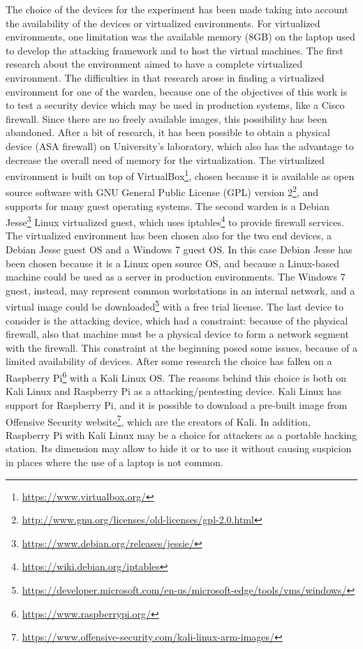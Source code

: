 \documentclass[12pt]{article}
\begin{document}
The choice of the devices for the experiment has been made taking into account the availability of the devices or virtualized environments. For virtualized environments, one limitation was the available memory (8GB) on the laptop used to develop the attacking framework and to host the virtual machines. The first research about the environment aimed to have a complete virtualized environment. The difficulties in that research arose in finding a virtualized environment for one of the warden, because one of the objectives of this work is to test a security device which may be used in production systems, like a Cisco firewall. Since there are no freely available images, this possibility has been abandoned. After a bit of research, it has been possible to obtain a physical device (ASA firewall) on University's laboratory, which also has the advantage to decrease the overall need of memory for the virtualization. The virtualized environment is built on top of VirtualBox\footnote{\url{https://www.virtualbox.org/}}, chosen because it is available as open source software with GNU General Public License (GPL) version 2\footnote{\url{http://www.gnu.org/licenses/old-licenses/gpl-2.0.html}}, and supports for many guest operating systems. The second warden is a Debian Jesse\footnote{\url{https://www.debian.org/releases/jessie/}} Linux virtualized guest, which uses iptables\footnote{\url{https://wiki.debian.org/iptables}} to provide firewall services. The virtualized environment has been chosen also for the two end devices, a Debian Jesse guest OS and a Windows 7 guest OS. In this case Debian Jesse has been chosen because it is a Linux open source OS, and because a Linux-based machine could be used as a server in production environments. The Windows 7 guest, instead, may represent common workstations in an internal network, and a virtual image could be downloaded\footnote{\url{https://developer.microsoft.com/en-us/microsoft-edge/tools/vms/windows/}} with a free trial license. The last device to consider is the attacking device, which had a constraint: because of the physical firewall, also that machine must be a physical device to form a network segment with the firewall. This constraint at the beginning posed some issues, because of a limited availability of devices. After some research the choice has fallen on a Raspberry Pi\footnote{\url{https://www.raspberrypi.org/}} with a Kali Linux OS. The reasons behind this choice is both on Kali Linux and Raspberry Pi as a attacking/pentesting device. Kali Linux has support for Raspberry Pi, and it is possible to download a pre-built image from Offensive Security website\footnote{\url{https://www.offensive-security.com/kali-linux-arm-images/}}, which are the creators of Kali. In addition, Raspberry Pi with Kali Linux may be a choice for attackers as a portable hacking station. Its dimension may allow to hide it or to use it without causing suspicion in places where the use of a laptop is not common.
\end{document}
